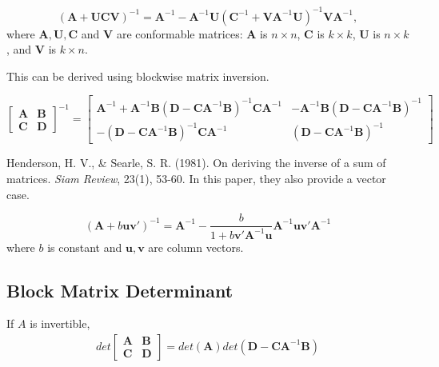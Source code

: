 \documentclass[11pt]{elegantbook}
\begin{document}
\begin{proposition}
    $${\displaystyle \left(\boldsymbol{A}+\boldsymbol{U}\boldsymbol{C}\boldsymbol{V}\right)^{-1}=\boldsymbol{A}^{-1}-\boldsymbol{A}^{-1}\boldsymbol{U}\left(\boldsymbol{C}^{-1}+\boldsymbol{V}\boldsymbol{A}^{-1}\boldsymbol{U}\right)^{-1}\boldsymbol{V}\boldsymbol{A}^{-1},}$$
    where $\boldsymbol{A}, \boldsymbol{U}, \boldsymbol{C}$ and $\boldsymbol{V}$ are conformable matrices: $\boldsymbol{A}$ is $n\times n$, $\boldsymbol{C}$ is $k\times k$, $\boldsymbol{U}$ is $n\times k$, and $\boldsymbol{V}$ is $k\times n$.
\end{proposition}
This can be derived using blockwise matrix inversion.
\begin{proposition}
    $$
    {\displaystyle {\begin{bmatrix}\mathbf {A} &\mathbf {B} \\\mathbf {C} &\mathbf {D} \end{bmatrix}}^{-1}={\begin{bmatrix}\mathbf {A} ^{-1}+\mathbf {A} ^{-1}\mathbf {B} \left(\mathbf {D} -\mathbf {CA} ^{-1}\mathbf {B} \right)^{-1}\mathbf {CA} ^{-1}&-\mathbf {A} ^{-1}\mathbf {B} \left(\mathbf {D} -\mathbf {CA} ^{-1}\mathbf {B} \right)^{-1}\\-\left(\mathbf {D} -\mathbf {CA} ^{-1}\mathbf {B} \right)^{-1}\mathbf {CA} ^{-1}&\left(\mathbf {D} -\mathbf {CA} ^{-1}\mathbf {B} \right)^{-1}\end{bmatrix}}}
    $$
\end{proposition}

Henderson, H. V., \& Searle, S. R. (1981). On deriving the inverse of a sum of matrices. \textit{Siam Review}, 23(1), 53-60. In this paper, they also provide a vector case.
\begin{corollary}
    $$(\boldsymbol{A}+b \boldsymbol{u}\boldsymbol{v}')^{-1}=\boldsymbol{A}^{-1}-\frac{b}{1+b \boldsymbol{v}' \boldsymbol{A}^{-1}\boldsymbol{u}}\boldsymbol{A}^{-1}\boldsymbol{u}\boldsymbol{v}' \boldsymbol{A}^{-1}$$
    where $b$ is constant and $\boldsymbol{u}, \boldsymbol{v}$ are column vectors.
\end{corollary}

\subsection{Block Matrix Determinant}
If $A$ is invertible,
\begin{equation}
    \begin{aligned}
        det \begin{bmatrix}\mathbf {A} &\mathbf {B} \\\mathbf {C} &\mathbf {D} \end{bmatrix}=det (\mathbf {A}) det (\mathbf {D}-\mathbf {C}\mathbf {A}^{-1}\mathbf {B})
    \end{aligned}
    \nonumber
\end{equation}
\end{document}
